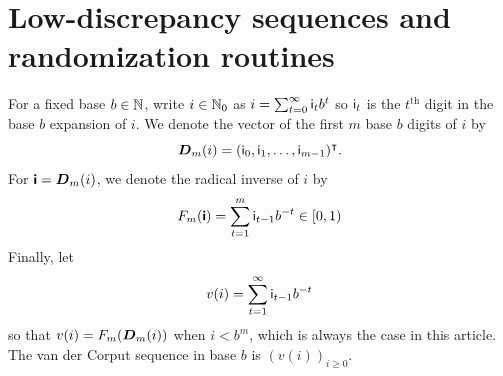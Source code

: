 \documentclass[acmsmall]{acmart}
\begin{document}
\section{Low-discrepancy sequences and randomization routines} \label{sec:LD_seq_and_randomizations}

For a fixed base $b \in {\mathbb{N}}$, write $i \in {\mathbb{N}}_0$ as $i = \sum_{t=0}^\infty {\mathsf{i}}_t b^t$ so ${\mathsf{i}}_t$ is the $t^\mathrm{th}$ digit in the base $b$ expansion of $i$. We denote the vector of the first $m$ base $b$ digits of $i$ by
$${\boldsymbol{D}}_m(i) = ({\mathsf{i}}_0,{\mathsf{i}}_1,\dots,{\mathsf{i}}_{m-1})^\intercal.$$
For ${\boldsymbol{\mathsf{i}}} = {\boldsymbol{D}}_m(i)$, we denote the radical inverse of $i$ by
$$F_m({\boldsymbol{\mathsf{i}}}) = \sum_{t=1}^m {\mathsf{i}}_{t-1} b^{-t} \in [0,1)$$
Finally, let
\begin{equation}
    v(i) = \sum_{t=1}^\infty {\mathsf{i}}_{t-1} b^{-t}
    \label{eq:v}
\end{equation}
so that $v(i) = F_m({\boldsymbol{D}}_m(i))$ when $i < b^m$, which is always the case in this article. The van der Corput sequence in base $b$ is $(v(i))_{i \geq 0}$.
\end{document}
